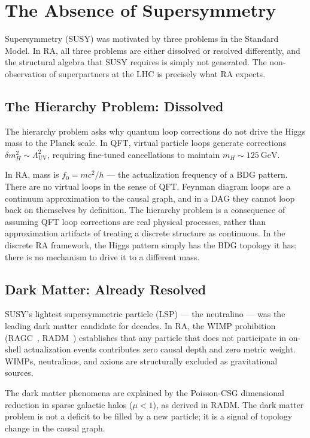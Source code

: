 \documentclass[11pt,a4paper]{article}
\begin{document}
\section{The Absence of Supersymmetry}
\label{sec:susy}

Supersymmetry (SUSY) was motivated by three problems in the Standard Model.
In RA, all three problems are either dissolved or resolved differently, and
the structural algebra that SUSY requires is simply not generated. The
non-observation of superpartners at the LHC is precisely what RA expects.

\subsection{The Hierarchy Problem: Dissolved}

The hierarchy problem asks why quantum loop corrections do not drive the Higgs
mass to the Planck scale. In QFT, virtual particle loops generate corrections
$\delta m_H^2 \sim \Lambda_{\mathrm{UV}}^2$, requiring fine-tuned cancellations
to maintain $m_H \sim 125~\text{GeV}$.

In RA, mass is $f_0 = mc^2/h$ --- the actualization frequency of a BDG pattern.
There are no virtual loops in the sense of QFT. Feynman diagram loops are a
continuum approximation to the causal graph, and in a DAG they cannot loop
back on themselves by definition. The hierarchy problem is a consequence of
assuming QFT loop corrections are real physical processes, rather than
approximation artifacts of treating a discrete structure as continuous.
In the discrete RA framework, the Higgs pattern simply has the BDG topology
it has; there is no mechanism to drive it to a different mass.

\subsection{Dark Matter: Already Resolved}

SUSY's lightest supersymmetric particle (LSP) --- the neutralino --- was the
leading dark matter candidate for decades. In RA, the WIMP prohibition
(RAGC~\citep{Sandeman2026RAGC}, RADM~\citep{Sandeman2026RADM}) establishes
that any particle that does not participate in on-shell actualization events
contributes zero causal depth and zero metric weight. WIMPs, neutralinos, and
axions are structurally excluded as gravitational sources.

The dark matter phenomena are explained by the Poisson-CSG dimensional
reduction in sparse galactic halos ($\mu < 1$), as derived in RADM.
The dark matter problem is not a deficit to be filled by a new particle;
it is a signal of topology change in the causal graph.
\end{document}
